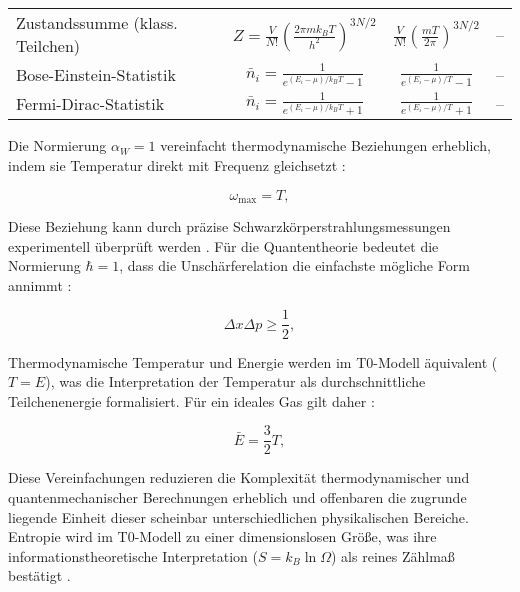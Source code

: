 \documentclass[twocolumn,aps,prl]{revtex4-2}
\begin{document}
\begin{table}[H]
{\begin{tabular}{lccc}
					Zustandssumme (klass. Teilchen) & $Z = \frac{V}{N!} \left( \frac{2\pi m k_B T}{h^2} \right)^{3N/2}$ & $\frac{V}{N!} \left( \frac{m T}{2\pi} \right)^{3N/2}$ & -- \\
					Bose-Einstein-Statistik & $\bar{n}_i = \frac{1}{e^{(E_i - \mu)/k_B T} - 1}$ & $\frac{1}{e^{(E_i - \mu)/T} - 1}$ & -- \\
					Fermi-Dirac-Statistik & $\bar{n}_i = \frac{1}{e^{(E_i - \mu)/k_B T} + 1}$ & $\frac{1}{e^{(E_i - \mu)/T} + 1}$ & -- \\
					\bottomrule
				\end{tabular}
			}
		\end{table}
		
		Die Normierung $\alpha_W = 1$ vereinfacht thermodynamische Beziehungen erheblich, indem sie Temperatur direkt mit Frequenz gleichsetzt \cite{Wien1896, Planck1901}:
		
		\begin{equation}
			\omega_{\text{max}} = T, \label{eq:wien_simplified}
		\end{equation}
		
		Diese Beziehung kann durch präzise Schwarzkörperstrahlungsmessungen experimentell überprüft werden \cite{pascher_alpha_2025}. Für die Quantentheorie bedeutet die Normierung $\hbar = 1$, dass die Unschärferelation die einfachste mögliche Form annimmt \cite{Heisenberg1925}:
		
		\begin{equation}
			\Delta x \Delta p \geq \frac{1}{2}, \label{eq:uncertainty_simplified}
		\end{equation}
		
		Thermodynamische Temperatur und Energie werden im T0-Modell äquivalent ($T = E$), was die Interpretation der Temperatur als durchschnittliche Teilchenenergie formalisiert. Für ein ideales Gas gilt daher \cite{Boltzmann1872}:
		
		\begin{equation}
			\bar{E} = \frac{3}{2} T, \label{eq:average_energy}
		\end{equation}
		
		Diese Vereinfachungen reduzieren die Komplexität thermodynamischer und quantenmechanischer Berechnungen erheblich und offenbaren die zugrunde liegende Einheit dieser scheinbar unterschiedlichen physikalischen Bereiche. Entropie wird im T0-Modell zu einer dimensionslosen Größe, was ihre informationstheoretische Interpretation ($S = k_B \ln \Omega$) als reines Zählmaß bestätigt \cite{pascher_alpha_2025}.
		
\end{document}
